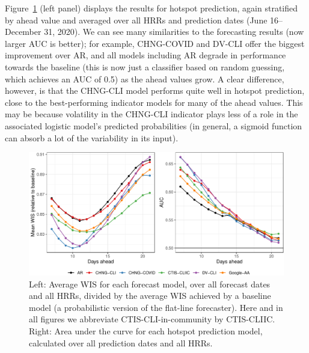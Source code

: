 \documentclass[9pt,twocolumn,twoside,lineno]{pnas-new}
\begin{document}

Figure~\ref{fig:forecast} (left panel) displays the results for hotspot prediction, again
stratified by ahead value and averaged over all HRRs and prediction dates (June 
16--December 31, 2020).  We can see many similarities to the forecasting
results (now larger AUC is better); for example, CHNG-COVID and DV-CLI offer the
biggest improvement over AR, and all models including AR degrade in performance 
towards the baseline (this is now just a classifier based on random guessing,
which achieves an AUC of 0.5) as the ahead values grow.  A clear difference,
however, is that the CHNG-CLI model performs quite well in hotspot prediction,
close to the best-performing indicator models for many of the ahead values. This
may be because volatility in the CHNG-CLI indicator plays less of a role in the
associated logistic model's predicted probabilities (in general, a sigmoid
function can absorb a lot of the variability in its input).

\begin{figure}[t]
  \includegraphics[width=\textwidth]{fig/fcast-hot-combo-1.pdf}
  \caption{Left: Average WIS for each forecast model, over all forecast dates and all
    HRRs, divided by the average WIS achieved by a baseline model (a
    probabilistic version of the flat-line forecaster).  Here and in all figures
    we abbreviate CTIS-CLI-in-community by CTIS-CLIIC.
    Right: Area under the curve for each hotspot prediction model, calculated over
    all prediction dates and all HRRs.
  }  
  \label{fig:forecast}
\end{figure}
\end{document}
